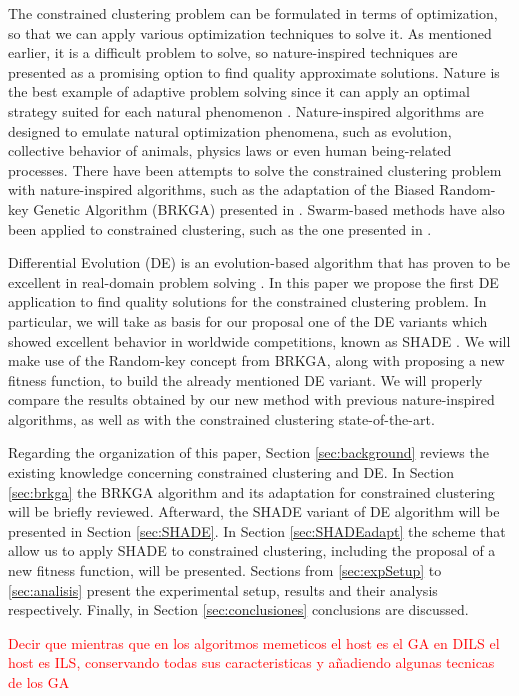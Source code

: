 \documentclass[review]{elsarticle}
\begin{document}
The constrained clustering problem can be formulated in terms of optimization, so that we can apply various optimization techniques to solve it. As mentioned earlier, it is a difficult problem to solve, so nature-inspired techniques are presented as a promising option to find quality approximate solutions. Nature is the best example of adaptive problem solving since it can apply an optimal strategy suited for each natural phenomenon \cite{fausto2019ants}. Nature-inspired algorithms are designed to emulate natural optimization phenomena, such as evolution, collective behavior of animals, physics laws or even human being-related processes. There have been attempts to solve the constrained clustering problem with nature-inspired algorithms, such as the adaptation of the Biased Random-key Genetic Algorithm (BRKGA) presented in \cite{de2017comparison}. Swarm-based methods have also been applied to constrained clustering, such as the one presented in \cite{xu2013improving}.

Differential Evolution (DE) is an evolution-based algorithm that has proven to be excellent in real-domain problem solving \cite{das2011differential}. In this paper we propose the first DE application to find quality solutions for the constrained clustering problem. In particular, we will take as basis for our proposal one of the DE variants which showed excellent behavior in worldwide competitions, known as SHADE \cite{molina2018insight}. We will make use of the Random-key concept from BRKGA, along with proposing a new fitness function, to build the already mentioned DE variant. We will properly compare the results obtained by our new method with previous nature-inspired algorithms, as well as with the constrained clustering state-of-the-art.

Regarding the organization of this paper, Section \ref{sec:background} reviews the existing knowledge concerning constrained clustering and DE. In Section \ref{sec:brkga} the BRKGA algorithm and its adaptation for constrained clustering will be briefly reviewed. Afterward, the SHADE variant of DE algorithm will be presented in Section \ref{sec:SHADE}. In Section \ref{sec:SHADEadapt} the scheme that allow us to apply SHADE to constrained clustering, including the proposal of a new fitness function, will be presented. Sections from \ref{sec:expSetup} to \ref{sec:analisis} present the experimental setup, results and their analysis respectively. Finally, in Section \ref{sec:conclusiones} conclusions are discussed.

\textcolor{red}{Decir que mientras que en los algoritmos memeticos el host es el GA en DILS el host es ILS, conservando todas sus caracteristicas y añadiendo algunas tecnicas de los GA}
\end{document}
